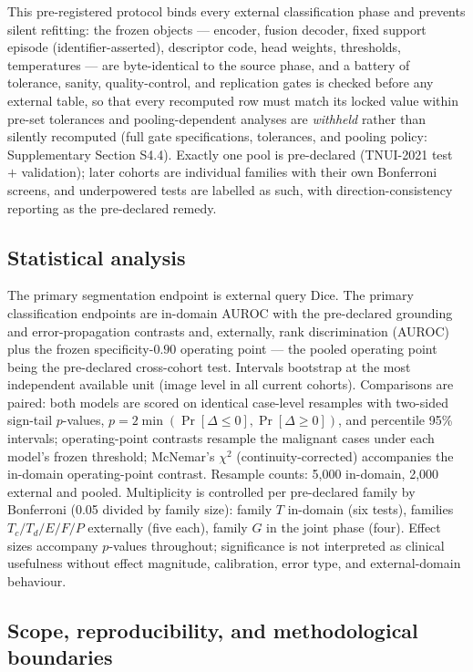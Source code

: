 \documentclass[jimh,article,submit,moreauthors,pdftex]{Definitions/tsp}
\begin{document}
This pre-registered protocol binds every external classification phase
and prevents silent refitting: the frozen objects --- encoder, fusion
decoder, fixed support episode (identifier-asserted), descriptor code,
head weights, thresholds, temperatures --- are byte-identical to the
source phase, and a battery of tolerance, sanity, quality-control, and
replication gates is checked before any external table, so that every
recomputed row must match its locked value within pre-set tolerances
and pooling-dependent analyses are \emph{withheld} rather than silently
recomputed (full gate specifications, tolerances, and pooling policy:
Supplementary Section S4.4). Exactly one pool is pre-declared
(TNUI-2021 test $+$ validation); later cohorts are individual families
with their own Bonferroni screens, and underpowered tests are labelled
as such, with direction-consistency reporting as the pre-declared
remedy.

\subsection{Statistical analysis}
\label{subsec:statistical_analysis}

The primary segmentation endpoint is external query Dice. The primary
classification endpoints are in-domain AUROC with the pre-declared
grounding and error-propagation contrasts and, externally, rank
discrimination (AUROC) plus the frozen specificity-$0.90$ operating
point --- the pooled operating point being the pre-declared
cross-cohort test. Intervals bootstrap at the most independent
available unit (image level in all current cohorts). Comparisons are
paired: both models are scored on identical case-level resamples with
two-sided sign-tail $p$-values,
$p = 2\min(\Pr[\Delta\leq0],\Pr[\Delta\geq0])$, and percentile 95\%
intervals; operating-point contrasts resample the malignant cases under
each model's frozen threshold; McNemar's $\chi^2$
(continuity-corrected) accompanies the in-domain operating-point
contrast. Resample counts: 5,000 in-domain, 2,000 external and pooled.
Multiplicity is controlled per pre-declared family by Bonferroni (0.05
divided by family size): family $T$ in-domain (six tests), families
$T_c/T_d/E/F/P$ externally (five each), family $G$ in the joint phase
(four). Effect sizes accompany $p$-values throughout; significance is
not interpreted as clinical usefulness without effect magnitude,
calibration, error type, and external-domain behaviour.

\subsection{Scope, reproducibility, and methodological boundaries}
\label{subsec:method_boundaries}
\end{document}

